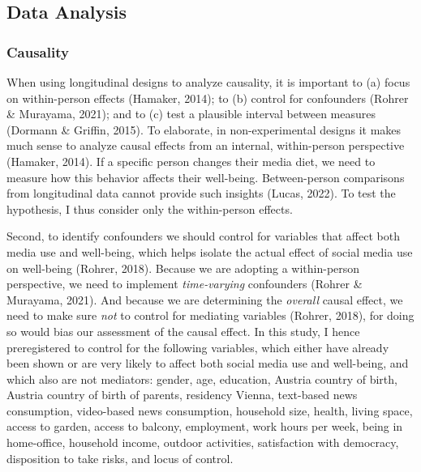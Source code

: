 \documentclass[
  man,floatsintext]{apa7}
\begin{document}
\hypertarget{data-analysis}{%
\subsection{Data Analysis}\label{data-analysis}}

\hypertarget{causality}{%
\subsubsection{Causality}\label{causality}}

When using longitudinal designs to analyze causality, it is important to (a) focus on within-person effects (Hamaker, 2014); to (b) control for confounders (Rohrer \& Murayama, 2021); and to (c) test a plausible interval between measures (Dormann \& Griffin, 2015).
To elaborate, in non-experimental designs it makes much sense to analyze causal effects from an internal, within-person perspective (Hamaker, 2014).
If a specific person changes their media diet, we need to measure how this behavior affects their well-being.
Between-person comparisons from longitudinal data cannot provide such insights (Lucas, 2022).
To test the hypothesis, I thus consider only the within-person effects.

Second, to identify confounders we should control for variables that affect both media use and well-being, which helps isolate the actual effect of social media use on well-being (Rohrer, 2018).
Because we are adopting a within-person perspective, we need to implement \emph{time-varying} confounders (Rohrer \& Murayama, 2021).
And because we are determining the \emph{overall} causal effect, we need to make sure \emph{not} to control for mediating variables (Rohrer, 2018), for doing so would bias our assessment of the causal effect.
In this study, I hence preregistered to control for the following variables, which either have already been shown or are very likely to affect both social media use and well-being, and which also are not mediators:
gender, age, education, Austria country of birth, Austria country of birth of parents, residency Vienna, text-based news consumption, video-based news consumption, household size, health, living space, access to garden, access to balcony, employment, work hours per week, being in home-office, household income, outdoor activities, satisfaction with democracy, disposition to take risks, and locus of control.
\end{document}
